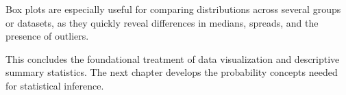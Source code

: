 Box plots are especially useful for comparing distributions across several groups or datasets, as they quickly reveal differences in medians, spreads, and the presence of outliers.

This concludes the foundational treatment of data visualization and descriptive summary statistics. The next chapter develops the probability concepts needed for statistical inference.
